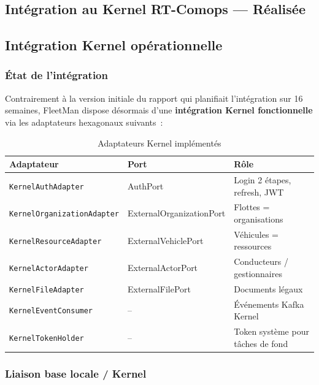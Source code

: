 \documentclass[12pt,a4paper]{report}
\begin{document}
\begin{enumerate}[leftmargin=2cm]
\part{Intégration au Kernel RT-Comops — Réalisée}

\chapter{Intégration Kernel opérationnelle}

\section{État de l'intégration}

Contrairement à la version initiale du rapport qui planifiait l'intégration
sur 16 semaines, FleetMan dispose désormais d'une \textbf{intégration Kernel
fonctionnelle} via les adaptateurs hexagonaux suivants~:

\begin{table}[H]
\caption{Adaptateurs Kernel implémentés}
\label{tab:kernel_adapters}
\centering\small
\begin{tabularx}{\textwidth}{p{3.5cm}p{3cm}X}
\toprule
\textbf{Adaptateur} & \textbf{Port} & \textbf{Rôle} \\
\midrule
\texttt{KernelAuthAdapter}       & AuthPort & Login 2 étapes, refresh, JWT \\
\texttt{KernelOrganizationAdapter} & ExternalOrganizationPort & Flottes = organisations \\
\texttt{KernelResourceAdapter}   & ExternalVehiclePort & Véhicules = ressources \\
\texttt{KernelActorAdapter}      & ExternalActorPort & Conducteurs / gestionnaires \\
\texttt{KernelFileAdapter}       & ExternalFilePort & Documents légaux \\
\texttt{KernelEventConsumer}     & -- & Événements Kafka Kernel \\
\texttt{KernelTokenHolder}       & -- & Token système pour tâches de fond \\
\bottomrule
\end{tabularx}
\end{table}

\section{Liaison base locale / Kernel}


\end{enumerate}
\end{document}
